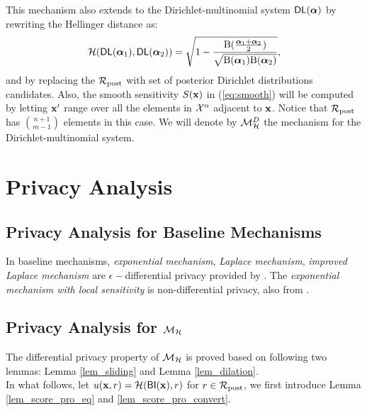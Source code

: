 \documentclass{article}
\begin{document}
This mechanism also extends to the Dirichlet-multinomial system $\mathsf{DL}(\boldsymbol{\alpha})$ by rewriting the Hellinger distance as:
\[
  \mathcal{H}(\mathsf{DL}(\boldsymbol{\alpha}_1), \mathsf{DL}(\boldsymbol{\alpha}_2)) = \sqrt{1 - \frac{\textup{B}(\frac{\boldsymbol{\alpha}_1 + \boldsymbol{\alpha}_2}{2})}{\sqrt{\textup{B}(\boldsymbol{\alpha}_1) \textup{B}(\boldsymbol{\alpha}_2)}}},
\]
and by replacing the $\mathcal{R}_{\textup{post}}$ with set of posterior Dirichlet
distributions candidates. Also, the smooth sensitivity $S(\textbf{x})$
in (\ref{eq:smooth}) will be computed by letting $\textbf{x}'$ range
over all the elements in $\mathcal{X}^{n}$ adjacent to $\textbf{x}$. Notice
that $\mathcal{R}_{\textup{post}}$ has $\binom{n + 1}{m - 1}$ elements in this case. We
will denote by $\mathcal{M}^{D}_{\mathcal{H}}$ the mechanism for the
Dirichlet-multinomial system.



\section{Privacy Analysis}

\subsection{Privacy Analysis for Baseline Mechanisms}
In baseline mechanisms, \emph{exponential mechanism}, \emph{Laplace mechanism}, \emph{improved Laplace mechanism} are $\epsilon-$differential privacy provided by \cite{dwork2014algorithmic}. The \emph{exponential mechanism with local sensitivity} is non-differential privacy, also from \cite{dwork2014algorithmic}.

\subsection{Privacy Analysis for $\mathcal{M}_{\mathcal{H}}$}

The differential privacy property of $\mathcal{M}_{\mathcal{H}}$ is proved based on following two lemmas: Lemma \ref{lem_sliding} and Lemma \ref{lem_dilation}.\\


In what follows, let $ u(\textbf{x}, {r}) = \mathcal{H}(\mathsf{BI}(\textbf{x}), r)$ for $r \in \mathcal{R}_{\textup{post}}$, we first introduce Lemma \ref{lem_score_pro_eq} and \ref{lem_score_pro_convert}.
\end{document}
